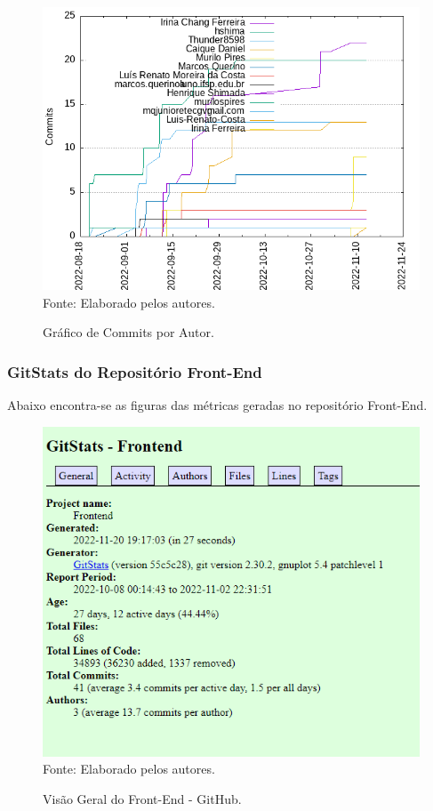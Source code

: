 \documentclass[
    12pt,               %
    openright,          %
    oneside,
    a4paper,            %
    BIBLATEX,           %
    TODO,               %
    english,            %
    brazil              %
    ]{ifsp-spo-inf-ctds}
\begin{document}
            
    \begin{figure}[H]
                \centering
                \caption{Gráfico de Commits por Autor.}
                \includegraphics[width=1 \textwidth]{Gitstats/documento/commitsPorAuthor.png}
                {\footnotesize Fonte: Elaborado pelos autores.}
                \label{fig:commitautor}
            \end{figure}
            


\subsubsection{GitStats do Repositório Front-End}
    Abaixo encontra-se as figuras das métricas geradas no repositório Front-End.
    
    \begin{figure}[H]
                \centering
                \caption{Visão Geral do Front-End - GitHub.}
                \includegraphics[width=1 \textwidth]{Gitstats/front-end/geralFront.png}
                {\footnotesize Fonte: Elaborado pelos autores.}
                \label{fig:geralFront}
            \end{figure}
    
\end{document}
